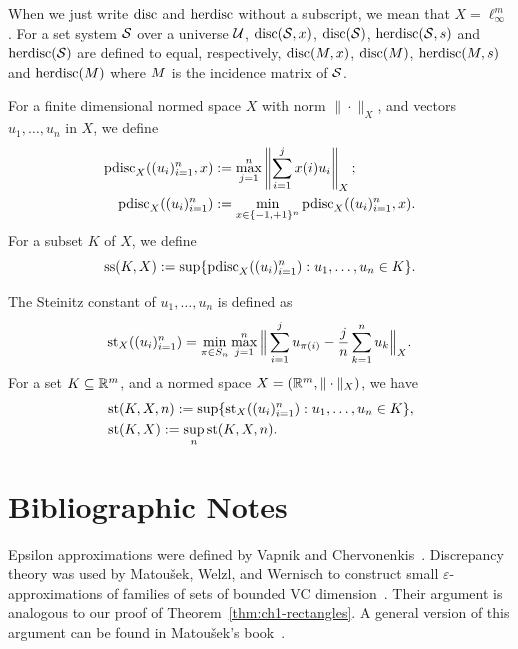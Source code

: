 When we just write $\operatorname{disc}$ and $\operatorname{herdisc}$ without a subscript, we mean
that $X = \ell_\infty^m$. For a set system $\mathcal{S}$ over a universe
$\mathcal{U}$, $\operatorname{disc}(\mathcal{S},x)$, $\operatorname{disc}(\mathcal{S})$, $\operatorname{herdisc}(\mathcal{S},s)$ and
$\operatorname{herdisc}(\mathcal{S})$ are defined to equal, respectively,
$\operatorname{disc}(M,x)$, $\operatorname{disc}(M)$, $\operatorname{herdisc}(M,s)$ and
$\operatorname{herdisc}(M)$ where $M$ is the incidence matrix of $\mathcal{S}$. 

For a finite dimensional normed space $X$ with norm $\|\cdot \|_X$, and
vectors $u_1, \ldots, u_n$ in $X$, we define
\begin{align*}
  \operatorname{pdisc}_X((u_i)_{i = 1}^n, x) &:=
  \max_{j=1}^n \left\|\sum_{i = 1}^jx(i)u_i \right\|_X;\\
  \operatorname{pdisc}_X((u_i)_{i=1}^n) &:= \min_{x \in \{-1,+1\}^n}\operatorname{pdisc}_X((u_i)_{i=1}^n,x).
\end{align*}
For a subset $K$ of $X$, we define
\[
  \operatorname{ss}(K, X) := \sup\{\operatorname{pdisc}_X((u_i)_{i=1}^n): u_1, \ldots, u_n \in K\}.
\]

The Steinitz
constant of \(u_1,\ldots, u_n\) is defined as 
\[
  \operatorname{st}_X((u_i)_{i=1}^n) = \min_{\pi \in S_n} \max_{j = 1}^n \Big\|\sum_{i = 1}^j
     u_{\pi(i)} - \frac{j}{n} \sum_{k = 1}^n u_k\Big\|_X.
\]
For a set \(K
\subseteq \mathbb{R}^m\), and a normed space \(X = (\mathbb{R}^m,\|\cdot\|_X)\), we  have
\begin{align*}
  &\operatorname{st}(K, X,n) := \sup\{\operatorname{st}_X((u_i)_{i=1}^n): u_1, \ldots, u_n \in K\},\\
  &\operatorname{st}(K, X) := \sup_n \operatorname{st}(K, X,n).
\end{align*}

\section{Bibliographic Notes}

Epsilon approximations were defined by Vapnik and Chervonenkis~\cite{VC71}. Discrepancy theory was used by Matou\v{s}ek, Welzl, and Wernisch to construct small $\varepsilon$-approximations of families of sets of bounded VC dimension~\cite{MatWW93}. Their argument is analogous to our proof of Theorem~\ref{thm:ch1-rectangles}. A general version of this argument can be found in Matou\v{s}ek's book~\cite{matousek2010geometric}.


